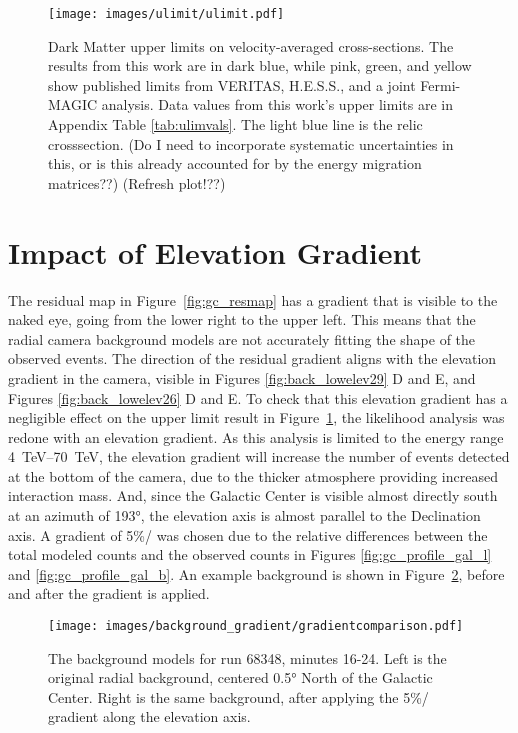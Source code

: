   \begin{figure}[ht]
    \centering
    \texttt{[image: images/ulimit/ulimit.pdf]}
    \caption[Dark Matter Upper Limit Plot]{
      Dark Matter upper limits on velocity-averaged cross-sections.
      The results from this work are in dark blue, while pink, green, and yellow show published limits from VERITAS, H.E.S.S., and a joint Fermi-MAGIC analysis.
      Data values from this work's upper limits are in Appendix Table \ref{tab:ulimvals}.
      The light blue line is the relic crosssection.
      {\color{red}(Do I need to incorporate systematic uncertainties in this, or is this already accounted for by the energy migration matrices??)}
      {\color{red}(Refresh plot!??)}
    }
    \label{fig:ulim}
  \end{figure}
  
\FloatBarrier

\section{Impact of Elevation Gradient}\label{sec:elevgradient}

  The residual map in Figure~\ref{fig:gc_resmap} has a gradient that is visible to the naked eye, going from the lower right to the upper left.
  This means that the radial camera background models are not accurately fitting the shape of the observed events.
  The direction of the residual gradient aligns with the elevation gradient in the camera, visible in Figures \ref{fig:back_lowelev29} D and E, and Figures \ref{fig:back_lowelev26} D and E.
  To check that this elevation gradient has a negligible effect on the upper limit result in Figure~\ref{fig:ulim}, the likelihood analysis was redone with an elevation gradient.
  As this analysis is limited to the energy range \SIrange{4}{70}{TeV}, the elevation gradient will increase the number of events detected at the bottom of the camera, due to the thicker atmosphere providing increased interaction mass.
  And, since the Galactic Center is visible almost directly south at an azimuth of \ang{193}, the elevation axis is almost parallel to the Declination axis.
  A gradient of 5\%/\degree{} was chosen due to the relative differences between the total modeled counts and the observed counts in Figures \ref{fig:gc_profile_gal_l} and \ref{fig:gc_profile_gal_b}.
  An example background is shown in Figure~\ref{fig:bkg_flatvsgrad}, before and after the gradient is applied.
  
  \begin{figure}[ht]
    \centering
    \texttt{[image: images/background\_gradient/gradientcomparison.pdf]}
    \caption[Background Gradient Comparison]{
      The background models for run 68348, minutes 16-24.
      Left is the original radial background, centered \ang{0.5} North of the Galactic Center.
      Right is the same background, after applying the 5\%/\degree{} gradient along the elevation axis.
    }
    \label{fig:bkg_flatvsgrad}
  \end{figure}
  
